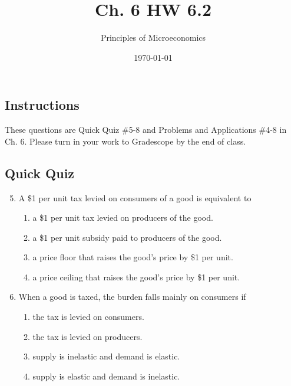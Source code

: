 \documentclass{article}
\title{Ch. 6 HW 6.2}
\author{Principles of Microeconomics}
\date{\today}
\begin{document}
\maketitle

\subsection*{Instructions}
These questions are Quick Quiz \#5-8 and Problems and Applications \#4-8 in Ch. 6. Please turn in your work to Gradescope by the end of class.

\subsection*{Quick Quiz}

\begin{enumerate}
\setcounter{enumi}{4}

\item A \$1 per unit tax levied on consumers of a good is equivalent to
	\begin{enumerate}
	
	\item a \$1 per unit tax levied on producers of the good.
	
	\item a \$1 per unit subsidy paid to producers of the good.
	
	\item a price floor that raises the good's price by \$1 per unit.
	
	\item a price ceiling that raises the good's price by \$1 per unit.
	
	\end{enumerate}
	
\item When a good is taxed, the burden falls mainly on consumers if
	\begin{enumerate}

	\item the tax is levied on consumers.
	
	\item the tax is levied on producers.
	
	\item supply is inelastic and demand is elastic.
	
	\item supply is elastic and demand is inelastic.
	
	\end{enumerate}
	

\end{enumerate}
\end{document}
